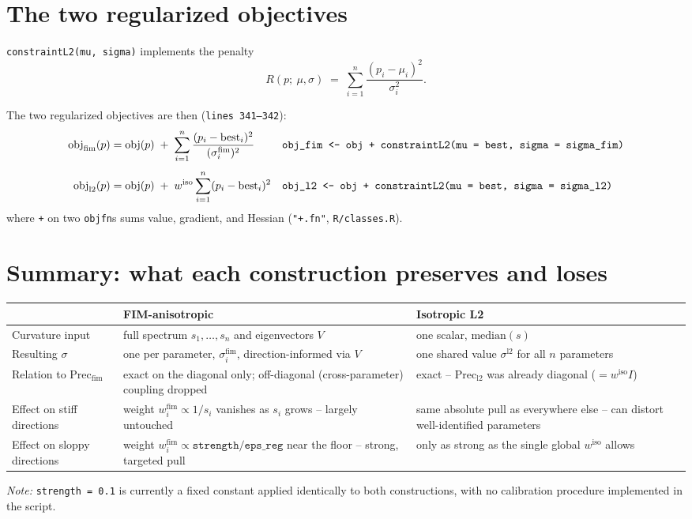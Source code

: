 \documentclass[11pt]{article}
\newcommand{\code}[1]{\texttt{#1}}
\newcommand{\file}[1]{\textcolor{black!60}{\texttt{#1}}}
\begin{document}
\section{The two regularized objectives}

\code{constraintL2(mu, sigma)} implements the penalty
\begin{equation}
  R(p;\ \mu,\sigma) \;=\; \sum_{i=1}^n \frac{(p_i - \mu_i)^2}{\sigma_i^2}.
\end{equation}

The two regularized objectives are then (\file{lines 341--342}):
\begin{align}
  \mathrm{obj}_{\mathrm{fim}}(p) &= \mathrm{obj}(p) \;+\; \sum_{i=1}^n \frac{(p_i - \mathrm{best}_i)^2}{(\sigma^{\mathrm{fim}}_i)^2}
  &&\text{\code{obj\_fim <- obj + constraintL2(mu = best, sigma = sigma\_fim)}} \\[4pt]
  \mathrm{obj}_{\mathrm{l2}}(p) &= \mathrm{obj}(p) \;+\; w^{\mathrm{iso}} \sum_{i=1}^n (p_i - \mathrm{best}_i)^2
  &&\text{\code{obj\_l2 <- obj + constraintL2(mu = best, sigma = sigma\_l2)}}
\end{align}
where \code{+} on two \code{objfn}s sums value, gradient, and Hessian
(\code{"+.fn"}, \file{R/classes.R}).

\section{Summary: what each construction preserves and loses}

\begin{center}
\begin{tabular}{@{}p{3.3cm}p{5.2cm}p{5.4cm}@{}}
\toprule
 & \textbf{FIM-anisotropic} & \textbf{Isotropic L2} \\
\midrule
Curvature input & full spectrum $s_1,\ldots,s_n$ and eigenvectors $V$ & one scalar, $\mathrm{median}(s)$ \\
Resulting $\sigma$ & one per parameter, $\sigma^{\mathrm{fim}}_i$, direction-informed via $V$ & one shared value $\sigma^{\mathrm{l2}}$ for all $n$ parameters \\
Relation to $\mathrm{Prec}_{\mathrm{fim}}$ & exact on the diagonal only; off-diagonal (cross-parameter) coupling dropped & exact -- $\mathrm{Prec}_{\mathrm{l2}}$ was already diagonal ($=w^{\mathrm{iso}}I$) \\
Effect on stiff directions & weight $w^{\mathrm{fim}}_i \propto 1/s_i$ vanishes as $s_i$ grows -- largely untouched & same absolute pull as everywhere else -- can distort well-identified parameters \\
Effect on sloppy directions & weight $w^{\mathrm{fim}}_i \propto \texttt{strength}/\texttt{eps\_reg}$ near the floor -- strong, targeted pull & only as strong as the single global $w^{\mathrm{iso}}$ allows \\
\bottomrule
\end{tabular}
\end{center}

\vspace{0.7em}
\noindent\textit{Note:} \code{strength = 0.1} is currently a fixed constant
applied identically to both constructions, with no calibration procedure
implemented in the script.
\end{document}
